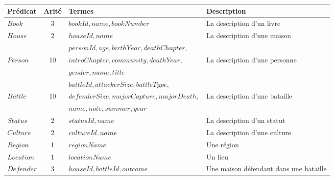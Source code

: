 \begin{table}[H]
    \centering
    \begin{adjustbox}{max width=\linewidth}
        \begin{tabular}{l|c|l|l}
            Prédicat            & Arité & Termes                                    & Description                               \\
            \hline
            \hline
            $Book$              & 3     & $bookId, name, bookNumber$                & La description d'un livre                 \\
            $House$             & 2     & $houseId, name$                           & La description d'une maison               \\
                                &       & $personId, age, birthYear, deathChapter,$ &                                           \\
            $Person$            & 10    & $introChapter, community,deathYear,$      & La description d'une personne             \\
                                &       & $gender, name, title$                     &                                           \\
                                &       & $battleId, attackerSize, battleType,$     &                                           \\
            $Battle$            & 10    & $defenderSize, majorCapture, majorDeath,$ & La description d'une bataille             \\
                                &       & $name, note, summer, year$                &                                           \\
            $Status$            & 2     & $statusId, name$                          & La description d'un statut                \\
            $Culture$           & 2     & $cultureId, name$                         & La description d'une culture              \\
            $Region$            & 1     & $regionName$                              & Une région                                \\
            $Location$          & 1     & $locationName$                            & Un lieu                                   \\
            $Defender$          & 3     & $houseId, battleId, outcome$              & Une maison défendant dans une bataille    \\

\end{tabular}
\end{adjustbox}
\end{table}
